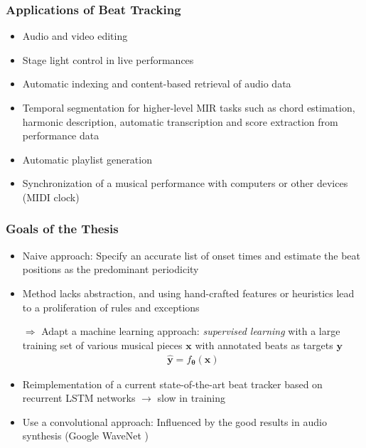 \documentclass{beamer}
\begin{document}
\begin{frame}
\frametitle{Applications of Beat Tracking}
\centering
{}
\vfill
\begin{itemize}
\item Audio and video editing 
\item Stage light control in live performances
\item Automatic indexing and content-based retrieval of audio data
\item Temporal segmentation for higher-level MIR tasks such as chord estimation, harmonic description, automatic transcription and score extraction from performance data 
\item Automatic playlist generation
\item Synchronization of a musical performance with computers or other devices (MIDI clock)
\end{itemize}
\end{frame}



\begin{frame}
\frametitle{Goals of the Thesis}
\begin{itemize}
\item Naive approach: Specify an accurate list of onset times and estimate the beat positions as the predominant periodicity 
\item Method lacks abstraction, and using hand-crafted features or heuristics lead to a proliferation of rules and exceptions
\item[$\Rightarrow$] Adapt a machine learning approach: \emph{supervised learning} with a large training set of various musical pieces $\mathbf x$ with annotated beats as targets $\mathbf y$
\begin{align}
\hat{\mathbf y} = f_{\boldsymbol \theta}(\mathbf x)
\end{align} 
\item Reimplementation of a current state-of-the-art beat tracker \cite{Boeck2014} based on recurrent LSTM networks $\rightarrow$ slow in training 
\item Use a convolutional approach: Influenced by the good results in audio synthesis (Google WaveNet \cite{Oord2016})

\end{itemize}


\end{frame}
\end{document}
